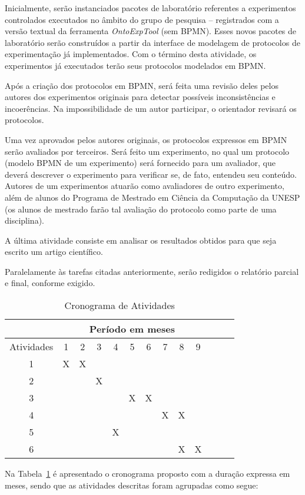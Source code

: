 Inicialmente, serão instanciados pacotes de laboratório referentes a experimentos controlados executados no âmbito do grupo de pesquisa -- registrados com a versão textual da ferramenta \textit{OntoExpTool} (sem BPMN). Esses novos pacotes de laboratório serão construídos a partir da interface de modelagem de protocolos de experimentação já implementados. Com o término desta atividade, os experimentos já executados terão seus protocolos modelados em BPMN.  

Após a criação dos protocolos em BPMN, será feita uma revisão deles pelos autores dos experimentos originais para detectar possíveis inconsistências e incoerências. Na impossibilidade de um autor participar, o orientador revisará os protocolos. 

Uma vez aprovados pelos autores originais, os protocolos expressos em BPMN serão avaliados por terceiros. Será feito um experimento, no qual um protocolo (modelo BPMN de um experimento) será fornecido para um avaliador, que deverá descrever o experimento para verificar se, de fato, entendeu seu conteúdo. Autores de um experimentos atuarão como avaliadores de outro experimento, além de alunos do Programa de Mestrado em Ciência da Computação da UNESP (os alunos de mestrado farão tal avaliação do protocolo como parte de uma disciplina).

A última atividade consiste em analisar os resultados obtidos para que seja escrito um artigo científico.

Paralelamente às tarefas citadas anteriormente, serão redigidos o relatório parcial e final, conforme exigido. 
\begin{table}[htbp]
\centering \caption{Cronograma de Atividades}\label{tab_cronograma2}
\begin{tabular}
{|c|c|c|c|c|c|c|c|c|c|c|c|c|} \cline{2-10}
\multicolumn{1}{c|}{}&\multicolumn{9}{c|}{\textbf{Período em meses}}
 \\
\cline{2-10}
\hline Atividades & 1   & 2   & 3   & 4   & 5   & 6   & 7   & 8   & 9   \\
\hline         1  & X   & X   &     &     &     &     &     &     &     \\
\hline         2  &     &     &  X  &     &     &     &     &     &     \\
\hline         3  &     &     &     &     &  X  &  X  &     &     &     \\
\hline         4  &     &     &     &     &     &     &  X  &  X  &     \\
\hline         5  &     &     &     &  X  &     &     &     &     &     \\
\hline         6  &     &     &     &     &     &     &     &  X  & X   \\
\hline
\end{tabular}
\normalsize
\end{table}
Na Tabela~\ref{tab_cronograma2} é apresentado o cronograma proposto com a duração expressa em meses, sendo que as atividades descritas foram agrupadas como segue: 


